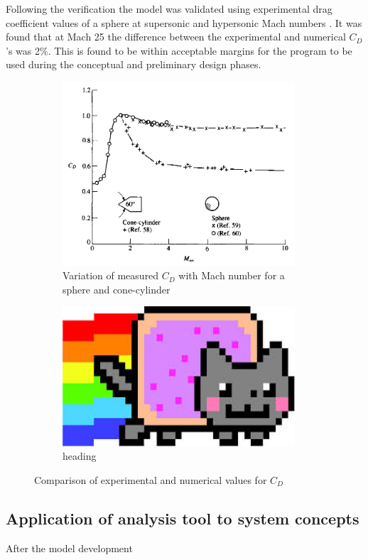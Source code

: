 Following the verification the model was validated using experimental drag coefficient values of a sphere at supersonic and hypersonic Mach numbers \cite[p. 783]{AndersonJr.2007}. It was found that at Mach 25 the difference between the experimental and numerical $C_{D}$'s was 2\%. This is found to be within acceptable margins for the program to be used during the conceptual and preliminary design phases.

\begin{figure}[h]
	\centering
	\begin{subfigure}[b]{0.49\textwidth}
		\centering
		\includegraphics[width=0.95\textwidth]{./Figure/CD_sphere_exp}
		\caption[Variation of measured $C_{D}$ with Mach number for a sphere and cone-cylinder]{Variation of measured $C_{D}$ with Mach number for a sphere and cone-cylinder \cite{AndersonJr.2007,Cox1965}}
		\label{fig:exp_cd}
	\end{subfigure}
	\begin{subfigure}[b]{0.49\textwidth}
		\centering
		\includegraphics[width=0.95\textwidth]{./Figure/Nyan}
		\caption{heading}
		\label{fig:num_cd}
	\end{subfigure}
	\caption{Comparison of experimental and numerical values for $C_{D}$}
	\label{fig:comparison_cd}
\end{figure}

\subsection{Application of analysis tool to system concepts}
\label{subsec:appaeroanal}
After the model development 